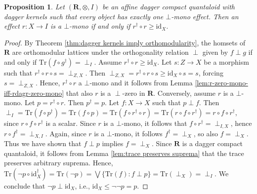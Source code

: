 \documentclass[12pt]{tac}
\newtheorem{proposition}[theorem]{Proposition}
\theoremstyle{definition}
\theoremstyle{remark}
\newcommand{\<}{\langle}
\renewcommand{\>}{\rangle}
\renewcommand{\:}{\colon}
\newcommand{\Tr}{\mathrm{Tr}}
\newcommand{\id}{\mathrm{id}}
\begin{document}
\begin{proposition}\label{prop:zero-mono effect iff function}
    Let $(\mathbf R,\otimes,I)$ be an affine dagger compact quantaloid with dagger kernels such that every object has exactly one $\bot$-mono effect. Then an effect $r:X\to I$ is a $\bot$-mono if and only if $r^\dag\circ r\geq \id_X$.   
\end{proposition}
\begin{proof}
By Theorem \ref{thm:dagger kernels imply orthomodularity}, the homsets of $\mathbf R$ are orthomodular lattices under the orthogonality relation $\perp$ given by $f\perp g$ if and only if $\Tr(f\circ g^\dag)=\perp_I$.
    Assume $r^\dag\circ r\geq \id_X$. Let $s:Z\to X$ be a morphism such that $r^\dag\circ r\circ s=\perp_{Z,X}$. Then $\perp_{Z,X}=r^\dag\circ r\circ s\geq \id_X\circ s=s$, forcing $s=\perp_{Z,X}$. Hence, $r^\dag\circ r$ a $\bot$-mono and it follows from Lemma \ref{lem:r-zero-mono-iff-rdagr-zero-mono} that also $r$ is a $\perp$-zero in $\mathbf R$. Conversely, assume $r$ is a $\bot$-mono. Let $p=r^\dag\circ r$. Then $p^\dag=p$. 
    Let $f:X\to X$ such that $p\perp f$. Then $\perp_I=\Tr(f\circ p^\dag)=\Tr(f\circ p)=\Tr(f\circ r^\dag\circ r)=\Tr(r\circ f\circ r^\dag)=r\circ f\circ r^\dag$, since $r\circ f\circ r^\dag$ is a scalar. Since $r$ is a $\bot$-mono, it follows that $f\circ r^\dag=\perp_{I,X}$, hence $r\circ f^\dag=\perp_{X,I}$. Again, since $r$ is a $\bot$-mono, it follows $f^\dag=\perp_X$, so also $f=\perp_X$. Thus we have shown that $f\perp p$ implies $f=\perp_X$. Since $\mathbf R$ is a dagger compact quantaloid, it follows from Lemma \ref{lem:trace preserves suprema} that the trace preserves arbitrary suprema. Hence,  $\Tr(\neg p\circ\id_X^\dag)=\Tr(\neg p)=\bigvee\{\Tr(f):f\perp p\}=\Tr(\perp_X)=\perp_I$. We conclude that $\neg p\perp\id_X$, i.e., $\id_X\leq \neg\neg p=p$. 
\end{proof}
\end{document}
